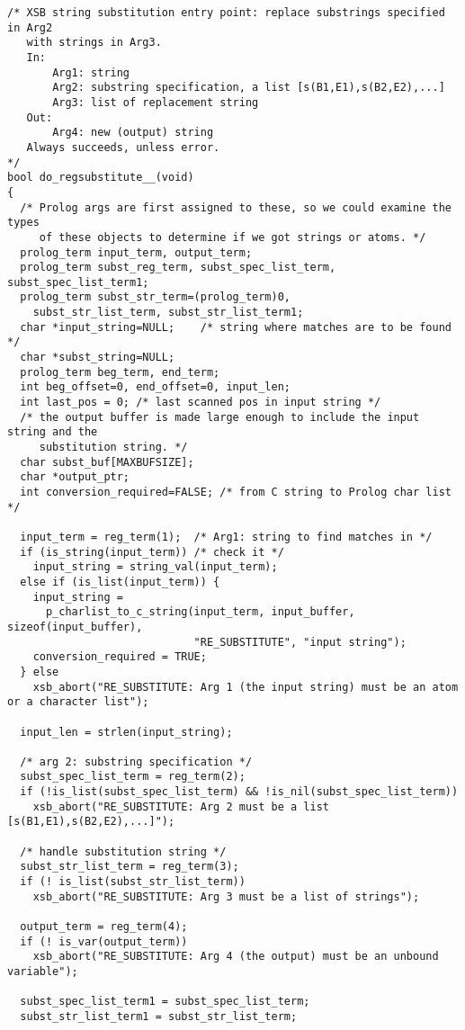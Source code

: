 \begin{verbatim}
/* XSB string substitution entry point: replace substrings specified in Arg2
   with strings in Arg3.
   In: 
       Arg1: string
       Arg2: substring specification, a list [s(B1,E1),s(B2,E2),...]
       Arg3: list of replacement string
   Out:
       Arg4: new (output) string
   Always succeeds, unless error.
*/
bool do_regsubstitute__(void)
{
  /* Prolog args are first assigned to these, so we could examine the types
     of these objects to determine if we got strings or atoms. */
  prolog_term input_term, output_term;
  prolog_term subst_reg_term, subst_spec_list_term, subst_spec_list_term1;
  prolog_term subst_str_term=(prolog_term)0,
    subst_str_list_term, subst_str_list_term1;
  char *input_string=NULL;    /* string where matches are to be found */
  char *subst_string=NULL;
  prolog_term beg_term, end_term;
  int beg_offset=0, end_offset=0, input_len;
  int last_pos = 0; /* last scanned pos in input string */
  /* the output buffer is made large enough to include the input string and the
     substitution string. */
  char subst_buf[MAXBUFSIZE];
  char *output_ptr;
  int conversion_required=FALSE; /* from C string to Prolog char list */

  input_term = reg_term(1);  /* Arg1: string to find matches in */
  if (is_string(input_term)) /* check it */
    input_string = string_val(input_term);
  else if (is_list(input_term)) {
    input_string =
      p_charlist_to_c_string(input_term, input_buffer, sizeof(input_buffer),
                             "RE_SUBSTITUTE", "input string");
    conversion_required = TRUE;
  } else
    xsb_abort("RE_SUBSTITUTE: Arg 1 (the input string) must be an atom or a character list");

  input_len = strlen(input_string);

  /* arg 2: substring specification */
  subst_spec_list_term = reg_term(2);
  if (!is_list(subst_spec_list_term) && !is_nil(subst_spec_list_term))
    xsb_abort("RE_SUBSTITUTE: Arg 2 must be a list [s(B1,E1),s(B2,E2),...]");

  /* handle substitution string */
  subst_str_list_term = reg_term(3);
  if (! is_list(subst_str_list_term))
    xsb_abort("RE_SUBSTITUTE: Arg 3 must be a list of strings");

  output_term = reg_term(4);
  if (! is_var(output_term))
    xsb_abort("RE_SUBSTITUTE: Arg 4 (the output) must be an unbound variable");

  subst_spec_list_term1 = subst_spec_list_term;
  subst_str_list_term1 = subst_str_list_term;


\end{verbatim}
